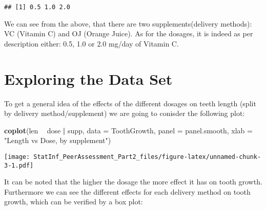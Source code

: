 \documentclass[]{article}
\newenvironment{Shaded}{\begin{snugshade}}{\end{snugshade}}
\newcommand{\KeywordTok}[1]{\textcolor[rgb]{0.13,0.29,0.53}{\textbf{#1}}}
\newcommand{\DataTypeTok}[1]{\textcolor[rgb]{0.13,0.29,0.53}{#1}}
\newcommand{\StringTok}[1]{\textcolor[rgb]{0.31,0.60,0.02}{#1}}
\newcommand{\OperatorTok}[1]{\textcolor[rgb]{0.81,0.36,0.00}{\textbf{#1}}}
\newcommand{\NormalTok}[1]{#1}
\begin{document}
\begin{Shaded}
\end{Shaded}

\begin{verbatim}
## [1] 0.5 1.0 2.0
\end{verbatim}

We can see from the above, that there are two supplements(delivery
methods): VC (Vitamin C) and OJ (Orange Juice). As for the dosages, it
is indeed as per description either: 0.5, 1.0 or 2.0 mg/day of Vitamin
C.

\section{Exploring the Data Set}\label{exploring-the-data-set}

To get a general idea of the effects of the different dosages on teeth
length (split by delivery method/supplement) we are going to conisder
the following plot:

\begin{Shaded}
\begin{Highlighting}[]
\KeywordTok{coplot}\NormalTok{(len }\OperatorTok{~}\StringTok{ }\NormalTok{dose }\OperatorTok{|}\StringTok{ }\NormalTok{supp, }\DataTypeTok{data =}\NormalTok{ ToothGrowth, }\DataTypeTok{panel =}\NormalTok{ panel.smooth, }\DataTypeTok{xlab =} \StringTok{"Length vs Dose, by supplement"}\NormalTok{)}
\end{Highlighting}
\end{Shaded}

\texttt{[image: StatInf\_PeerAssessment\_Part2\_files/figure-latex/unnamed-chunk-3-1.pdf]}

It can be noted that the higher the dosage the more effect it has on
tooth growth. Furthermore we can see the different effects for each
delivery method on tooth growth, which can be verified by a box plot:

\begin{Shaded}
\end{Shaded}
\end{document}

